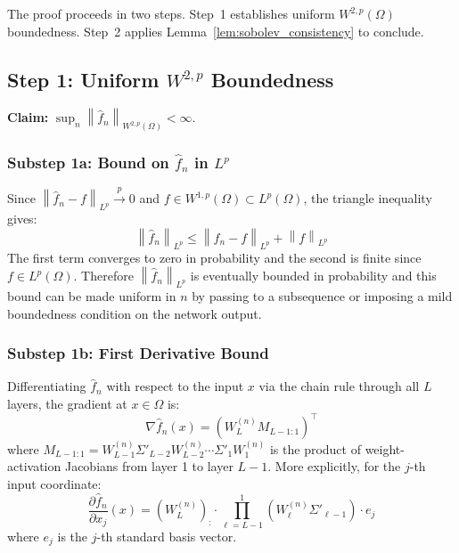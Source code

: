 \documentclass[12pt]{article}
\newcommand{\norm}[1]{\left\| #1 \right\|}
\newcommand{\Lp}{L^p(\Omega)}
\newcommand{\Wonep}{W^{1,p}(\Omega)}
\newcommand{\Wtwop}{W^{2,p}(\Omega)}
\newcommand{\fn}{\hat{f}_n}
\newcommand{\xrightarrowp}{\xrightarrow{p}}
\begin{document}
	The proof proceeds in two steps. Step~1 establishes uniform $\Wtwop$
	boundedness. Step~2 applies Lemma~\ref{lem:sobolev_consistency} to conclude.
	
	\subsection{Step 1: Uniform $W^{2,p}$ Boundedness}
	
	\textbf{Claim:} $\sup_n \norm{\fn}_{\Wtwop} < \infty$.
	
	\subsubsection*{Substep 1a: Bound on $\fn$ in $L^p$}
	
	Since $\norm{\fn - f}_{L^p} \xrightarrowp 0$ and $f \in \Wonep \subset \Lp$,
	the triangle inequality gives:
	\begin{equation}
		\norm{\fn}_{L^p} \leq \norm{\fn - f}_{L^p} + \norm{f}_{L^p}
	\end{equation}
	The first term converges to zero in probability and the second is finite
	since $f \in \Lp$. Therefore $\norm{\fn}_{L^p}$ is eventually bounded in
	probability and this bound can be made uniform in $n$ by passing to
	a subsequence or imposing a mild boundedness condition on the network output.
	
	\subsubsection*{Substep 1b: First Derivative Bound}
	
	Differentiating $\fn$ with respect to the input $x$ via the chain rule
	through all $L$ layers, the gradient at $x \in \Omega$ is:
	\begin{equation}
		\nabla \fn(x) = \left(W_L^{(n)} M_{L-1:1}\right)^\top
	\end{equation}
	where $M_{L-1:1} = W_{L-1}^{(n)} \Sigma'_{L-2} W_{L-2}^{(n)} \cdots
	\Sigma'_1 W_1^{(n)}$ is the product of weight-activation Jacobians from
	layer 1 to layer $L-1$. More explicitly, for the $j$-th input coordinate:
	\begin{equation}
		\frac{\partial \fn}{\partial x_j}(x)
		= \left(W_L^{(n)}\right)_{:} \cdot
		\prod_{\ell=L-1}^{1} \left(W_\ell^{(n)} \Sigma'_{\ell-1}\right) \cdot e_j
	\end{equation}
	where $e_j$ is the $j$-th standard basis vector.
	
\end{document}
